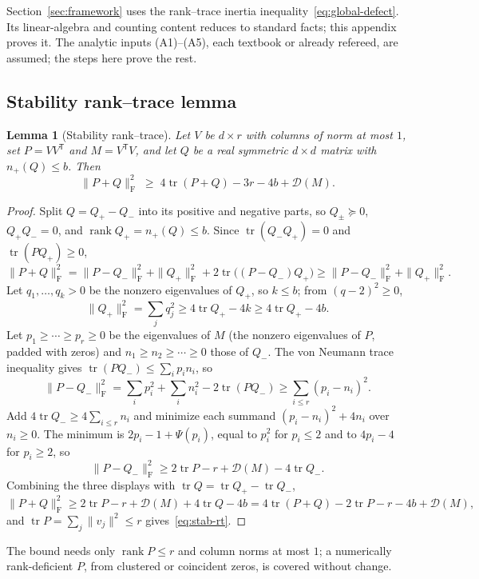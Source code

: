 \documentclass[11pt]{article}
\newtheorem{lemma}[theorem]{Lemma}
\theoremstyle{definition}
\DeclareMathOperator{\tr}{tr}
\DeclareMathOperator{\rank}{rank}
\newcommand{\F}{\mathrm{F}}
\begin{document}
Section~\ref{sec:framework} uses the rank--trace inertia
inequality~\eqref{eq:global-defect}. Its linear-algebra and counting content
reduces to standard facts; this appendix proves it. The analytic inputs
(A1)--(A5), each textbook or already refereed, are assumed; the steps here
prove the rest.

\subsection{Stability rank--trace lemma}

\begin{lemma}[Stability rank--trace]\label{lem:stab-rt}
Let $V$ be $d\times r$ with columns of norm at most $1$, set $P=VV^{\mathsf T}$ and
$M=V^{\mathsf T}V$, and let $Q$ be a real symmetric $d\times d$ matrix with
$n_+(Q)\le b$. Then
\begin{equation}\label{eq:stab-rt}
  \|P+Q\|_{\F}^2\;\ge\;4\tr(P+Q)-3r-4b+\mathcal D(M).
\end{equation}
\end{lemma}

\begin{proof}
Split $Q=Q_+-Q_-$ into its positive and negative parts, so $Q_\pm\succeq0$,
$Q_+Q_-=0$, and $\rank Q_+=n_+(Q)\le b$. Since $\tr(Q_-Q_+)=0$ and
$\tr(PQ_+)\ge0$,
\[
  \|P+Q\|_{\F}^2=\|P-Q_-\|_{\F}^2+\|Q_+\|_{\F}^2+2\tr\!\big((P-Q_-)Q_+\big)
  \ge\|P-Q_-\|_{\F}^2+\|Q_+\|_{\F}^2 .
\]
Let $q_1,\dots,q_k>0$ be the nonzero eigenvalues of $Q_+$, so $k\le b$; from
$(q-2)^2\ge0$,
\[
  \|Q_+\|_{\F}^2=\sum_j q_j^2\ge4\tr Q_+-4k\ge4\tr Q_+-4b .
\]
Let $p_1\ge\cdots\ge p_r\ge0$ be the eigenvalues of $M$ (the nonzero eigenvalues
of $P$, padded with zeros) and $n_1\ge n_2\ge\cdots\ge0$ those of $Q_-$. The von
Neumann trace inequality gives $\tr(PQ_-)\le\sum_i p_in_i$, so
\[
  \|P-Q_-\|_{\F}^2=\sum_i p_i^2+\sum_i n_i^2-2\tr(PQ_-)\ge\sum_{i\le r}(p_i-n_i)^2 .
\]
Add $4\tr Q_-\ge4\sum_{i\le r}n_i$ and minimize each summand
$(p_i-n_i)^2+4n_i$ over $n_i\ge0$. The minimum is $2p_i-1+\Psi(p_i)$, equal to
$p_i^2$ for $p_i\le2$ and to $4p_i-4$ for $p_i\ge2$, so
\[
  \|P-Q_-\|_{\F}^2\ge2\tr P-r+\mathcal D(M)-4\tr Q_- .
\]
Combining the three displays with $\tr Q=\tr Q_+-\tr Q_-$,
\[
  \|P+Q\|_{\F}^2\ge2\tr P-r+\mathcal D(M)+4\tr Q-4b
  =4\tr(P+Q)-2\tr P-r-4b+\mathcal D(M),
\]
and $\tr P=\sum_j\|v_j\|^2\le r$ gives~\eqref{eq:stab-rt}.
\end{proof}

The bound needs only $\rank P\le r$ and column norms at most $1$; a numerically
rank-deficient $P$, from clustered or coincident zeros, is covered without change.
\end{document}
